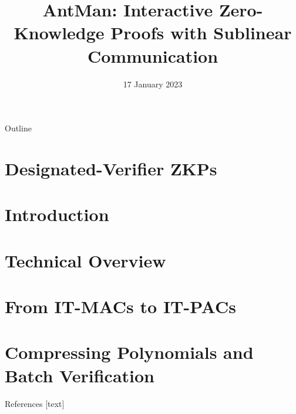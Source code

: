 \documentclass{beamer}
\title{AntMan: Interactive Zero-Knowledge Proofs with Sublinear Communication}
\date{17 January 2023}
\begin{document}
	\begin{frame}
		\titlepage
	\end{frame}
	
	\begin{frame}{Outline}
		\tableofcontents
	\end{frame}
	
	\section{Designated-Verifier ZKPs}
	
	
	\section{Introduction}
	
	
	\section{Technical Overview}
	
	
	\section{From IT-MACs to IT-PACs}
	
	
	\section{Compressing Polynomials and Batch Verification}
	
	
	\thankyouframe
	
	\begin{frame}[allowframebreaks]{References}
		
		
		
	\end{frame}
	
\end{document}
